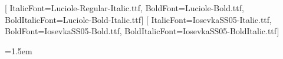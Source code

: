 %
%
\usepackage{fontspec}
\usepackage{unicode-math}
\usepackage[protrusion=true,expansion=false,final]{microtype}

\setmainfont{Luciole-Regular.ttf}[
  ItalicFont=Luciole-Regular-Italic.ttf,
  BoldFont=Luciole-Bold.ttf,
  BoldItalicFont=Luciole-Bold-Italic.ttf]
\setmonofont{IosevkaSS05-Regular.ttf}[
  ItalicFont=IosevkaSS05-Italic.ttf,
  BoldFont=IosevkaSS05-Bold.ttf,
  BoldItalicFont=IosevkaSS05-BoldItalic.ttf]

\emergencystretch=1.5em

\makeatletter
\renewcommand{\tiny}        {\@setfontsize\tiny{7}{8.5}}
\renewcommand{\scriptsize}  {\@setfontsize\scriptsize{8}{10}}
\renewcommand{\footnotesize}{\@setfontsize\footnotesize{9}{11.5}}
\renewcommand{\small}       {\@setfontsize\small{10}{13}}
\renewcommand{\normalsize}  {\@setfontsize\normalsize{11}{14.3}}
\renewcommand{\large}       {\@setfontsize\large{13}{16}}
\renewcommand{\Large}       {\@setfontsize\Large{15}{18}}
\renewcommand{\LARGE}       {\@setfontsize\LARGE{17}{20}}
\renewcommand{\huge}        {\@setfontsize\huge{20}{23}}
\renewcommand{\Huge}        {\@setfontsize\Huge{23}{26}}

\renewcommand{\section}{\@startsection{section}{1}{\z@}{-3.5ex \@plus -1ex \@minus -.2ex}{2.3ex \@plus.2ex}{\normalfont\Large}}
\renewcommand{\subsection}{\@startsection{subsection}{2}{\z@}{-3.25ex\@plus -1ex \@minus -.2ex}{1.5ex \@plus .2ex}{\normalfont\large}}
\renewcommand{\subsubsection}{\@startsection{subsubsection}{3}{\z@}{-3.25ex\@plus -1ex \@minus -.2ex}{1.5ex \@plus .2ex}{\normalfont\normalsize}}
\makeatother

